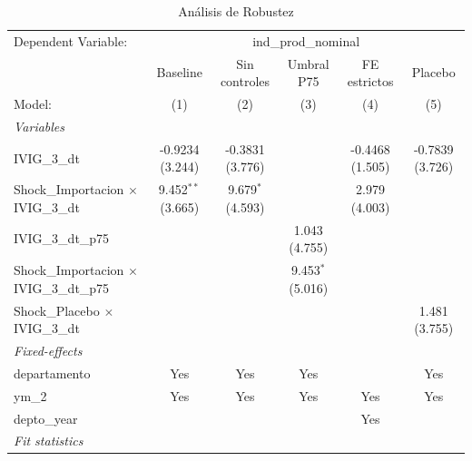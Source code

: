 \documentclass[12pt]{article}
\begin{document}
\begin{table}[htbp]
\centering
\begin{threeparttable}

   \caption{Análisis de Robustez}
   \centering
   \small
   \begin{tabular}{lccccc}
      \tabularnewline \midrule \midrule
      Dependent Variable: & \multicolumn{5}{c}{ind\_prod\_nominal}\\
                                                        & Baseline             & Sin controles       & Umbral P75          & FE estrictos    & Placebo \\   
      Model:                                            & (1)                  & (2)                 & (3)                 & (4)             & (5)\\  
      \midrule
      \emph{Variables}\\
      IVIG\_3\_dt                                       & -0.9234 (3.244)      & -0.3831 (3.776)     &                     & -0.4468 (1.505) & -0.7839 (3.726)\\   
      Shock\_Importacion $\times$ IVIG\_3\_dt           & 9.452$^{**}$ (3.665) & 9.679$^{*}$ (4.593) &                     & 2.979 (4.003)   &   \\   
      IVIG\_3\_dt\_p75                                  &                      &                     & 1.043 (4.755)       &                 &   \\   
      Shock\_Importacion $\times$ IVIG\_3\_dt\_p75      &                      &                     & 9.453$^{*}$ (5.016) &                 &   \\   
      Shock\_Placebo $\times$ IVIG\_3\_dt               &                      &                     &                     &                 & 1.481 (3.755)\\   
      \midrule
      \emph{Fixed-effects}\\
      departamento                                      & Yes                  & Yes                 & Yes                 &                 & Yes\\  
      ym\_2                                             & Yes                  & Yes                 & Yes                 & Yes             & Yes\\  
      depto\_year                                       &                      &                     &                     & Yes             & \\  
      \midrule
      \emph{Fit statistics}\\

\end{tabular}
\end{threeparttable}
\end{table}
\end{document}
